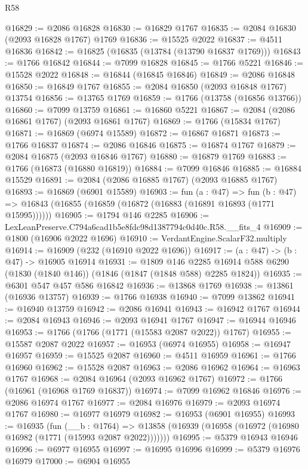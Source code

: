 \begin{lexlean}{R58}
\begin{coremodule}
@16829 := @2086 @16828
@16830 := @16829 @1767
@16835 := @2084 @16830 (@2093 @16828 @1767) @1769
@16836 := @15525 @2022
@16837 := @4511 @16836
@16842 := @16825 (@16835 (@13784 (@13790 @16837 @1769)))
@16843 := @1766 @16842
@16844 := @7099 @16828
@16845 := @1766 @5221
@16846 := @15528 @2022
@16848 := @16844 (@16845 @16846)
@16849 := @2086 @16848
@16850 := @16849 @1767
@16855 := @2084 @16850 (@2093 @16848 @1767) @13754
@16856 := @13765 @1769
@16859 := @1766 (@13758 (@16856 @13766))
@16860 := @7099 @13759
@16861 := @16860 @5221
@16867 := @2084 (@2086 @16861 @1767) (@2093 @16861 @1767)
@16869 := @1766 (@15834 @1767)
@16871 := @16869 (@6974 @15589)
@16872 := @16867 @16871
@16873 := @1766 @16837
@16874 := @2086 @16846
@16875 := @16874 @1767
@16879 := @2084 @16875 (@2093 @16846 @1767)
@16880 := @16879 @1769
@16883 := @1766 (@16873 (@16880 @16819))
@16884 := @7099 @16846
@16885 := @16884 @15529
@16891 := @2084 (@2086 @16885 @1767) (@2093 @16885 @1767)
@16893 := @16869 (@6901 @15589)
@16903 := fun (a : @47) =>
  fun (b : @47) => @16843 (@16855 (@16859 (@16872 (@16883 (@16891 @16893 (@1771 @15995))))))
@16905 := @1794 @146 @2285
@16906 := LexLeanPreserve.C794a6cad1b5e8fdc98d1387794c0d40c.R58.__fits_4
@16909 := @1800 (@16906 @2022 @1696)
@16910 := VerdantEngine.ScalarF32.multiply
@16914 := @16909 (@232 (@16910 @2022 @1696))
@16917 := (a : @47) -> (b : @47) -> @16905 @16914
@16931 := @1809
    @146
    @2285
    @16914
    @588
    @6290
    (@1830 (@1840 @146))
    (@1846 (@1847 (@1848 @588) @2285 @1824))
@16935 := @6301 @547 @457 @586 @16842
@16936 := @13868 @1769
@16938 := @13861 (@16936 @13757)
@16939 := @1766 @16938
@16940 := @7099 @13862
@16941 := @16940 @13759
@16942 := @2086 @16941
@16943 := @16942 @1767
@16944 := @2084 @16943
@16946 := @2093 @16941 @1767
@16947 := @16944 @16946
@16953 := @1766 (@1766 (@1771 (@15583 @2087 @2022)) @1767)
@16955 := @15587 @2087 @2022
@16957 := @16953 (@6974 @16955)
@16958 := @16947 @16957
@16959 := @15525 @2087
@16960 := @4511 @16959
@16961 := @1766 @16960
@16962 := @15528 @2087
@16963 := @2086 @16962
@16964 := @16963 @1767
@16968 := @2084 @16964 (@2093 @16962 @1767)
@16972 := @1766 (@16961 (@16968 @1769 @16837))
@16974 := @7099 @16962 @16846
@16976 := @2086 @16974 @1767
@16977 := @2084 @16976
@16979 := @2093 @16974 @1767
@16980 := @16977 @16979
@16982 := @16953 (@6901 @16955)
@16993 := @16935
    (fun (__b : @1764) =>
    @13858 (@16939 (@16958 (@16972 (@16980 @16982 (@1771 (@15993 @2087 @2022)))))))
@16995 := @5379 @16943 @16946
@16996 := @6977 @16955
@16997 := @16995 @16996
@16999 := @5379 @16976 @16979
@17000 := @6904 @16955

\end{coremodule}
\end{lexlean}
